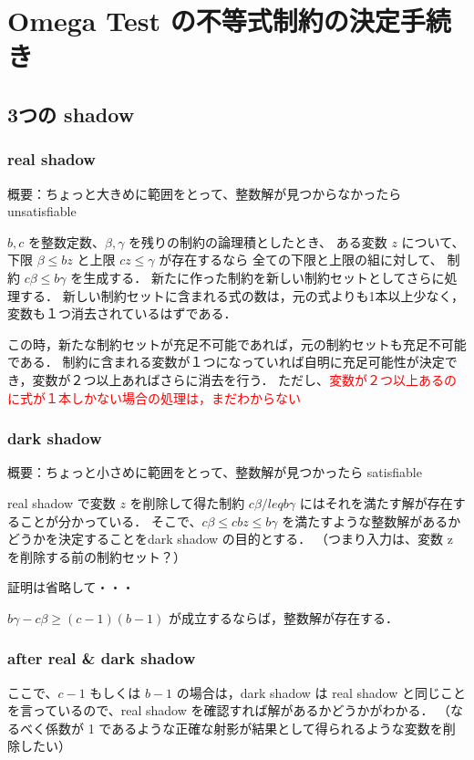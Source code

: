 \section{Omega Test の不等式制約の決定手続き}

\subsection*{3つの shadow}

\subsubsection*{real shadow}
概要：ちょっと大きめに範囲をとって、整数解が見つからなかったら unsatisfiable

$b, c$ を整数定数、$\beta, \gamma$ を残りの制約の論理積としたとき、
ある変数 $z$ について、下限 $\beta \leq bz$ と上限 $cz \leq \gamma$ が存在するなら
全ての下限と上限の組に対して、
制約 $c\beta \leq b\gamma$ を生成する．
新たに作った制約を新しい制約セットとしてさらに処理する．
新しい制約セットに含まれる式の数は，元の式よりも1本以上少なく，変数も１つ消去されているはずである．

この時，新たな制約セットが充足不可能であれば，元の制約セットも充足不可能である．
制約に含まれる変数が１つになっていれば自明に充足可能性が決定でき，変数が２つ以上あればさらに消去を行う．
ただし、\textcolor{red}{変数が２つ以上あるのに式が１本しかない場合の処理は，まだわからない}

\subsubsection*{dark shadow}
概要：ちょっと小さめに範囲をとって、整数解が見つかったら satisfiable 

real shadow で変数 $z$ を削除して得た制約 $c\beta /leq b\gamma$ にはそれを満たす解が存在することが分かっている．
そこで、$c\beta \leq cbz \leq b\gamma$ を満たすような整数解があるかどうかを決定することをdark shadow の目的とする．
（つまり入力は、変数 z を削除する前の制約セット？）

証明は省略して・・・

$b\gamma - c\beta \geq (c-1)(b-1)$ が成立するならば，整数解が存在する．

\subsubsection*{after real \& dark shadow}
ここで、$c-1$ もしくは $b-1$ の場合は，dark shadow は real shadow と同じことを言っているので、real shadow を確認すれば解があるかどうかがわかる．
（なるべく係数が 1 であるような正確な射影が結果として得られるような変数を削除したい）

